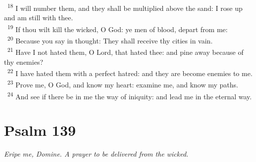 \documentclass[a5paper,12pt]{article}
\begin{document}
\begin{multicols*}{2}
~\textsuperscript{18} I will number them, and they shall be multiplied above the sand: I rose up and am still with thee.\\
~\textsuperscript{19} If thou wilt kill the wicked, O God: ye men of blood, depart from me:\\
~\textsuperscript{20} Because you say in thought: They shall receive thy cities in vain.\\
~\textsuperscript{21} Have I not hated them, O Lord, that hated thee: and pine away because of thy enemies?\\
~\textsuperscript{22} I have hated them with a perfect hatred: and they are become enemies to me.\\
~\textsuperscript{23} Prove me, O God, and know my heart: examine me, and know my paths.\\
~\textsuperscript{24} And see if there be in me the way of iniquity: and lead me in the eternal way.\\

\section{Psalm 139}
\label{sec:orgdd91c0a}
\emph{Eripe me, Domine. A prayer to be delivered from the wicked.}\\


\end{multicols*}
\end{document}
